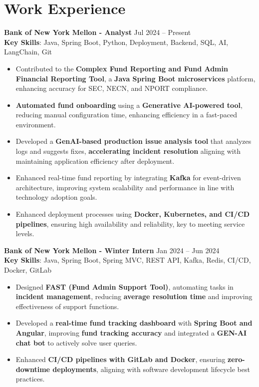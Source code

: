 \documentclass[a4paper,10pt]{article}
\begin{document}
\section*{Work Experience}

\textbf{Bank of New York Mellon - Analyst} \hfill Jul 2024 -- Present\\
\textbf{Key Skills}: Java, Spring Boot, Python, Deployment, Backend, SQL, AI, LangChain, Git  
\begin{itemize}
    \item Contributed to the \textbf{Complex Fund Reporting and Fund Admin Financial Reporting Tool}, a \textbf{Java Spring Boot microservices} platform, enhancing accuracy for SEC, NECN, and NPORT compliance.  
    \item \textbf{Automated fund onboarding} using a \textbf{Generative AI-powered tool}, reducing manual configuration time, enhancing efficiency in a fast-paced environment.  
    \item Developed a \textbf{GenAI-based production issue analysis tool} that analyzes logs and suggests fixes, \textbf{accelerating incident resolution} aligning with maintaining application efficiency after deployment.  
    \item Enhanced real-time fund reporting by integrating \textbf{Kafka} for event-driven architecture, improving system scalability and performance in line with technology adoption goals.  
    \item Enhanced deployment processes using \textbf{Docker, Kubernetes, and CI/CD pipelines}, ensuring high availability and reliability, key to meeting service levels.
\end{itemize}
\vspace{3 pt}
\textbf{Bank of New York Mellon - Winter Intern} \hfill Jan 2024 -- Jun 2024\\
\textbf{Key Skills}: Java, Spring Boot, Spring MVC, REST API, Kafka, Redis, CI/CD, Docker, GitLab  
\begin{itemize}
    \item Designed \textbf{FAST (Fund Admin Support Tool)}, automating tasks in \textbf{incident management}, reducing \textbf{average resolution time} and improving effectiveness of support functions.  
    \item Developed a \textbf{real-time fund tracking dashboard} with \textbf{Spring Boot and Angular}, improving \textbf{fund tracking accuracy} and integrated a \textbf{GEN-AI chat bot }to actively solve user queries.
    \item Enhanced \textbf{CI/CD pipelines with GitLab and Docker}, ensuring \textbf{zero-downtime deployments}, aligning with software development lifecycle best practices.  
\end{itemize}
\end{document}
